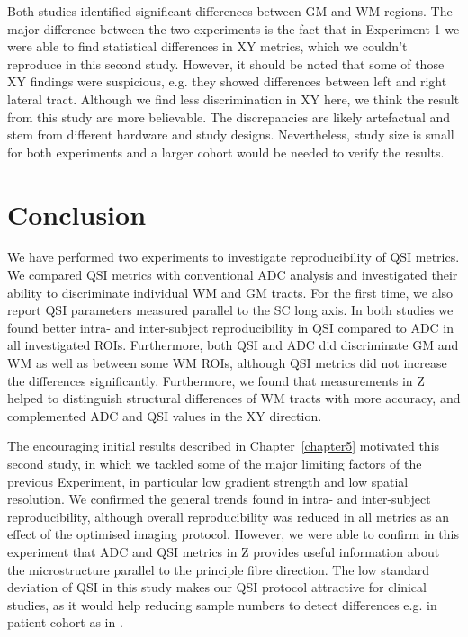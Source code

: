 Both studies identified significant differences between GM and WM regions. The major difference between the two experiments is the fact that in Experiment 1 we were able to find statistical differences in XY metrics, which we couldn't reproduce in this second study. However, it should be noted that some of those XY findings were suspicious, e.g. they showed differences between left and right lateral tract. Although we find less discrimination in XY here, we think the result from this study are more believable. The discrepancies are likely artefactual and stem from different hardware and study designs. Nevertheless, study size is small for both experiments and a larger cohort would be needed to verify the results.
 
 

\section{Conclusion}
\label{par:chapter5 exp2 correlation}
We have performed two experiments to investigate reproducibility of QSI metrics. We compared QSI metrics with conventional ADC analysis and investigated their ability to discriminate individual WM and GM tracts. For the first time, we also report QSI parameters measured parallel to the \gls{SC} long axis. In both studies we found better intra- and inter-subject reproducibility in QSI compared to ADC in all investigated \glspl{ROI}. Furthermore, both QSI and ADC did discriminate GM and WM as well as between some WM \glspl{ROI}, although QSI metrics did not increase the differences significantly. Furthermore, we found that measurements in Z helped to distinguish structural differences of WM tracts with more accuracy, and complemented ADC and QSI values in the XY direction.


The encouraging initial results described in Chapter~\ref{chapter5} motivated this second study, in which we tackled some of the major limiting factors of the previous Experiment, in particular low gradient strength and low spatial resolution. We confirmed the general trends found in intra- and inter-subject reproducibility, although overall reproducibility was reduced in all metrics as an effect of the optimised imaging protocol. However, we were able to confirm in this experiment that ADC and QSI metrics in Z provides useful information about the microstructure parallel to the principle fibre direction. The low standard deviation of QSI in this study makes our QSI protocol attractive for clinical studies, as it would help reducing sample numbers to detect differences e.g. in patient cohort as in \citep{Farrell:2008}.



